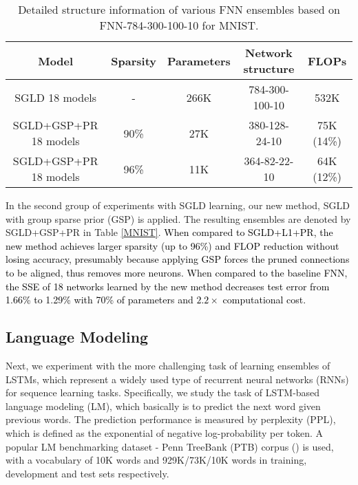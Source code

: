 \documentclass{article} %
\newcommand{\ozj}{\textcolor{black}}
\begin{document}
\begin{table}[t]
	\caption{Detailed structure information of various FNN ensembles based on FNN-784-300-100-10 for MNIST.}
	\label{FNN_SSE}
	\begin{center}
		\begin{tabular}{ccccc}
			\toprule
			\multicolumn{1}{c}{Model}
			&\multicolumn{1}{c}{Sparsity}
			&\multicolumn{1}{c}{Parameters}
			&\multicolumn{1}{c}{Network structure}
			&\multicolumn{1}{c}{FLOPs} \\
			\toprule
			SGLD 18 models & - & 266K & 784-300-100-10 & 532K \\
			SGLD+GSP+PR 18 models & 90\% &27K &380-128-24-10 &75K (14\%) \\
			SGLD+GSP+PR 18 models & 96\% &11K &364-82-22-10 &64K (12\%) \\
			\bottomrule
		\end{tabular}
	\end{center}
\end{table}

In the second group of experiments with SGLD learning, our new method, SGLD with group sparse prior (GSP) is applied. The resulting ensembles are denoted by SGLD+GSP+PR in Table \ref{MNIST}.
\ozj{
When compared to SGLD+L1+PR, the new method achieves larger sparsity (up to 96\%) and FLOP reduction without losing accuracy, presumably because applying GSP forces the pruned connections to be aligned, thus removes more neurons.
When compared to the baseline FNN, the SSE of 18 networks learned by the new method decreases test error from 1.66\% to 1.29\% with 70\% of parameters and $ 2.2\times $ computational cost.}


\subsection{Language Modeling}

Next, we experiment with the more challenging task of learning ensembles of LSTMs, which represent a widely used type of recurrent
neural networks (RNNs) for sequence learning tasks.
Specifically, we study the task of LSTM-based language modeling (LM), which basically is to predict the next word given previous words.
The prediction performance is measured by perplexity (PPL), which is defined as the exponential of negative log-probability per token.
A popular LM benchmarking dataset - Penn TreeBank (PTB) corpus (\citet{marcus1993building}) is used, with a vocabulary of 10K words and 929K/73K/10K words in training, development and test sets respectively.
 
\end{document}
